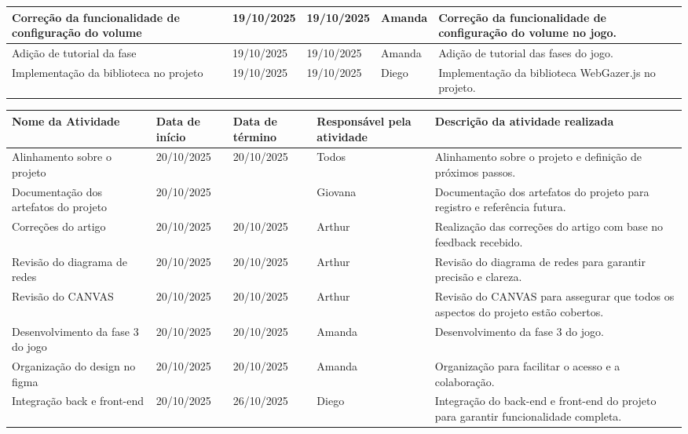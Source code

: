\documentclass[
landscape,
  a4paper,%
  12pt,%
  english,%
  brazilian,%
]{article}
\begin{document}
\begin{table}[]
\begin{tabular}{|p{5cm}|l|l|l|p{8cm}|}
Correção da funcionalidade de configuração do volume & 19/10/2025  & 19/10/2025 & Amanda   & Correção da funcionalidade de configuração do volume no jogo. \\ \hline
Adição de tutorial da fase                         & 19/10/2025  & 19/10/2025 & Amanda   & Adição de tutorial das fases do jogo. \\ \hline
Implementação da biblioteca no projeto & 19/10/2025 & 19/10/2025 & Diego   & Implementação da biblioteca WebGazer.js no projeto. \\ \hline
\end{tabular}
\end{table}

\break

 \begin{table}[]
\centering
\begin{tabular}{|p{5cm}|l|l|l|p{8cm}|}
\hline
Nome da Atividade & Data de início & Data de término & Responsável pela atividade & Descrição da atividade realizada \\ \hline
Alinhamento sobre o projeto                        & 20/10/2025  & 20/10/2025 & Todos   & Alinhamento sobre o projeto e definição de próximos passos. \\ \hline
Documentação dos artefatos do projeto             & 20/10/2025  &            & Giovana   & Documentação dos artefatos do projeto para registro e referência futura. \\ \hline
Correções do artigo                                & 20/10/2025  & 20/10/2025 & Arthur   & Realização das correções do artigo com base no feedback recebido. \\ \hline
Revisão do diagrama de redes                       & 20/10/2025  & 20/10/2025 & Arthur   & Revisão do diagrama de redes para garantir precisão e clareza. \\ \hline
Revisão do CANVAS                                 & 20/10/2025  & 20/10/2025 & Arthur   & Revisão do CANVAS para assegurar que todos os aspectos do projeto estão cobertos. \\ \hline
Desenvolvimento da fase 3 do jogo                 & 20/10/2025  & 20/10/2025 & Amanda   & Desenvolvimento da fase 3 do jogo. \\ \hline
Organização do design no figma                    & 20/10/2025  & 20/10/2025 & Amanda   & Organização para facilitar o acesso e a colaboração. \\ \hline
Integração back e front-end                       & 20/10/2025  & 26/10/2025 & Diego   & Integração do back-end e front-end do projeto para garantir funcionalidade completa. \\ \hline

\end{tabular}
\end{table}
\end{document}
